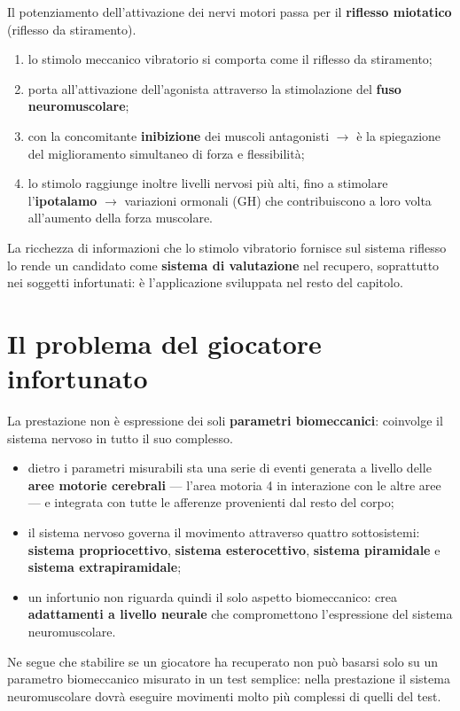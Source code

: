 Il potenziamento dell'attivazione dei nervi motori passa per il \textbf{riflesso miotatico}
(riflesso da stiramento).
\begin{enumerate}
  \item lo stimolo meccanico vibratorio si comporta come il riflesso da stiramento;
  \item porta all'attivazione dell'agonista attraverso la stimolazione del \textbf{fuso
    neuromuscolare};
  \item con la concomitante \textbf{inibizione} dei muscoli antagonisti $\rightarrow$ è la
    spiegazione del miglioramento simultaneo di forza e flessibilità;
  \item lo stimolo raggiunge inoltre livelli nervosi più alti, fino a stimolare l'\textbf{ipotalamo}
    $\rightarrow$ variazioni ormonali (GH) che contribuiscono a loro volta all'aumento della forza
    muscolare.
\end{enumerate}

La ricchezza di informazioni che lo stimolo vibratorio fornisce sul sistema riflesso lo rende un
candidato come \textbf{sistema di valutazione} nel recupero, soprattutto nei soggetti infortunati: è
l'applicazione sviluppata nel resto del capitolo.

\section{Il problema del giocatore infortunato}

La prestazione non è espressione dei soli \textbf{parametri biomeccanici}: coinvolge il sistema
nervoso in tutto il suo complesso.
\begin{itemize}
  \item dietro i parametri misurabili sta una serie di eventi generata a livello delle \textbf{aree
    motorie cerebrali} --- l'area motoria 4 in interazione con le altre aree --- e integrata con
    tutte le afferenze provenienti dal resto del corpo;
  \item il sistema nervoso governa il movimento attraverso quattro sottosistemi: \textbf{sistema
    propriocettivo}, \textbf{sistema esterocettivo}, \textbf{sistema piramidale} e \textbf{sistema
    extrapiramidale};
  \item un infortunio non riguarda quindi il solo aspetto biomeccanico: crea \textbf{adattamenti a
    livello neurale} che compromettono l'espressione del sistema neuromuscolare.
\end{itemize}
Ne segue che stabilire se un giocatore ha recuperato non può basarsi solo su un parametro
biomeccanico misurato in un test semplice: nella prestazione il sistema neuromuscolare dovrà
eseguire movimenti molto più complessi di quelli del test.

